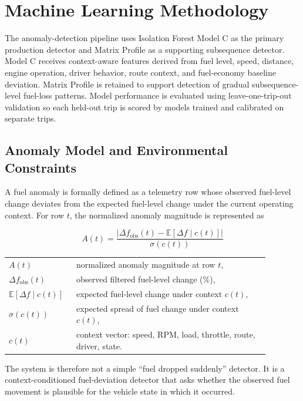 \section{Machine Learning Methodology}
\label{sec:ml}

The anomaly-detection pipeline uses Isolation Forest Model C as the primary production detector and Matrix Profile as a supporting subsequence detector. Model C receives context-aware features derived from fuel level, speed, distance, engine operation, driver behavior, route context, and fuel-economy baseline deviation. Matrix Profile is retained to support detection of gradual subsequence-level fuel-loss patterns. Model performance is evaluated using leave-one-trip-out validation so each held-out trip is scored by models trained and calibrated on separate trips.

\subsection{Anomaly Model and Environmental Constraints}
\label{sec:anomaly_model_constraints}

A fuel anomaly is formally defined as a telemetry row whose observed fuel-level change deviates from the expected fuel-level change under the current operating context. For row $t$, the normalized anomaly magnitude is represented as

\begin{equation}
A(t) =
\frac{\left|\Delta f_{\mathrm{obs}}(t) - \mathbb{E}[\Delta f \mid c(t)]\right|}
{\sigma(c(t))}
\label{eq:fuel_anomaly_model}
\end{equation}
\noindent\begin{tabular}{@{}p{0.20\linewidth}@{\quad}p{0.68\linewidth}@{}}
$A(t)$ & normalized anomaly magnitude at row $t$, \\
$\Delta f_{\mathrm{obs}}(t)$ & observed filtered fuel-level change (\%), \\
$\mathbb{E}[\Delta f \mid c(t)]$ & expected fuel-level change under context $c(t)$, \\
$\sigma(c(t))$ & expected spread of fuel change under context $c(t)$, \\
$c(t)$ & context vector: speed, RPM, load, throttle, route, driver, state.
\end{tabular}

\vspace{0.5em}
The system is therefore not a simple ``fuel dropped suddenly'' detector. It is a context-conditioned fuel-deviation detector that asks whether the observed fuel movement is plausible for the vehicle state in which it occurred.

